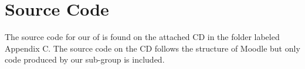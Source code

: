 
\chapter{Source Code}
The source code for our \subsystem{} of \system{} is found on the attached CD in the folder labeled Appendix C. 
The source code on the CD follows the structure of Moodle but only code produced by our sub-group is included. 